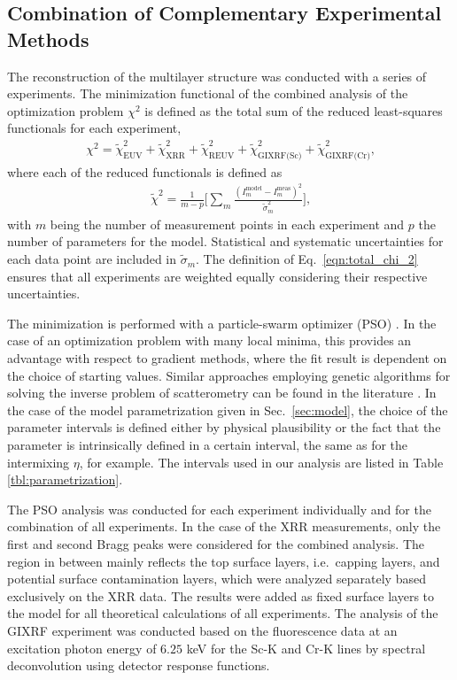 \subsection{Combination of Complementary Experimental Methods}
The reconstruction of the multilayer structure was conducted with a series of 
experiments. The minimization functional of the combined analysis of the 
optimization problem $\chi^2$ is defined as the total sum of the reduced 
least-squares functionals for each experiment,
\begin{align}
\chi^2 = \tilde{\chi}^2_\text{EUV} +\tilde{\chi}^2_\text{XRR} 
+\tilde{\chi}^2_\text{REUV} + 
\tilde{\chi}^2_\text{GIXRF(Sc)}+\tilde{\chi}^2_\text{GIXRF(Cr)}\text{,} 
\label{eqn:total_chi_2}
\end{align}
where each of the reduced functionals is defined as
\begin{align}
\tilde{\chi}^2 = \frac{1}{m - p} \bigg[\sum\limits_{m} \frac{(I_m^\text{model} 
- I_m^\text{meas})^2}{\tilde{\sigma}_m^2} \bigg] \text{,} 
\label{eqn:reduced_chi_2}
\end{align}
with $m$ being the number of measurement points in each experiment and $p$ the 
number of parameters for the model. Statistical and systematic uncertainties 
for each data point are included in $\tilde{\sigma}_m$. The definition of 
Eq.~\eqref{eqn:total_chi_2} ensures that all experiments are weighted equally 
considering their respective uncertainties.

The minimization is performed with a particle-swarm optimizer (PSO) 
\cite{kennedy_particle_2011}. In the case of an optimization problem with many local 
minima, this provides an advantage with respect to gradient methods, where the 
fit result is dependent on the choice of starting values. Similar approaches 
employing genetic algorithms for solving the inverse problem of scatterometry 
can be found in the literature \cite{del_rio_modeling_2000}. In the case of the model 
parametrization given in Sec.~\ref{sec:model}, the choice of the parameter 
intervals is defined either by physical plausibility or the fact that the 
parameter is intrinsically defined in a certain interval, the same as for the 
intermixing $\eta$, for example. The intervals used in our analysis are listed 
in Table \ref{tbl:parametrization}.

The PSO analysis was conducted for each experiment individually and for the 
combination of all experiments. In the case of the XRR measurements, only the 
first and second Bragg peaks were considered for the combined analysis. The 
region in between mainly reflects the top surface layers, i.e.~capping layers, 
and potential surface contamination layers, which were analyzed separately 
based exclusively on the XRR data. The results were added as fixed surface 
layers to the model for all theoretical calculations of all experiments. The 
analysis of the GIXRF experiment was conducted based on the fluorescence data 
at an excitation photon energy of $6.25$ keV for the Sc-K and Cr-K lines by spectral 
deconvolution using detector response functions.


